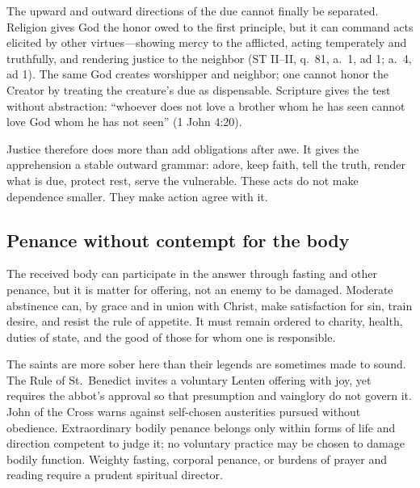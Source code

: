 The upward and outward directions of the due cannot finally be separated. Religion gives God the honor owed to the first principle, but it can command acts elicited by other virtues---showing mercy to the afflicted, acting temperately and truthfully, and rendering justice to the neighbor (ST II--II, q.~81, a.~1, ad 1; a.~4, ad 1). The same God creates worshipper and neighbor; one cannot honor the Creator by treating the creature's due as dispensable. Scripture gives the test without abstraction: ``whoever does not love a brother whom he has seen cannot love God whom he has not seen'' (1 John 4:20).

Justice therefore does more than add obligations after awe. It gives the apprehension a stable outward grammar: adore, keep faith, tell the truth, render what is due, protect rest, serve the vulnerable. These acts do not make dependence smaller. They make action agree with it.

\subsection{Penance without contempt for the body}

The received body can participate in the answer through fasting and other penance, but it is matter for offering, not an enemy to be damaged. Moderate abstinence can, by grace and in union with Christ, make satisfaction for sin, train desire, and resist the rule of appetite. It must remain ordered to charity, health, duties of state, and the good of those for whom one is responsible.

The saints are more sober here than their legends are sometimes made to sound. The Rule of St.~Benedict invites a voluntary Lenten offering with joy, yet requires the abbot's approval so that presumption and vainglory do not govern it. John of the Cross warns against self-chosen austerities pursued without obedience. Extraordinary bodily penance belongs only within forms of life and direction competent to judge it; no voluntary practice may be chosen to damage bodily function. Weighty fasting, corporal penance, or burdens of prayer and reading require a prudent spiritual director.

